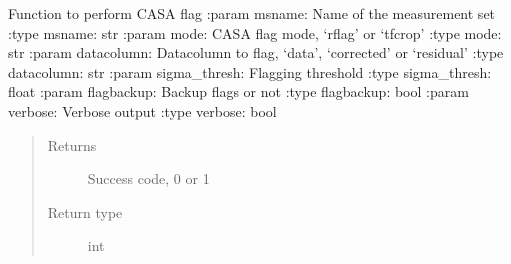 \documentclass[letterpaper,10pt,english]{sphinxmanual}
\begin{document}
\begin{fulllineitems}
\label{\detokenize{paircars:paircars.flagger.casa_autoflag}}
\sphinxAtStartPar
Function to perform CASA flag
:param msname: Name of the measurement set
:type msname: str
:param mode: CASA flag mode, ‘rflag’ or ‘tfcrop’
:type mode: str
:param datacolumn: Datacolumn to flag, ‘data’, ‘corrected’ or ‘residual’
:type datacolumn: str
:param sigma\_thresh: Flagging threshold
:type sigma\_thresh: float
:param flagbackup: Backup flags or not
:type flagbackup: bool
:param verbose: Verbose output
:type verbose: bool
\begin{quote}\begin{description}
\item[{Returns}] \leavevmode
\sphinxAtStartPar
Success code, 0 or 1

\item[{Return type}] \leavevmode
\sphinxAtStartPar
int

\end{description}\end{quote}

\end{fulllineitems}

\end{document}
